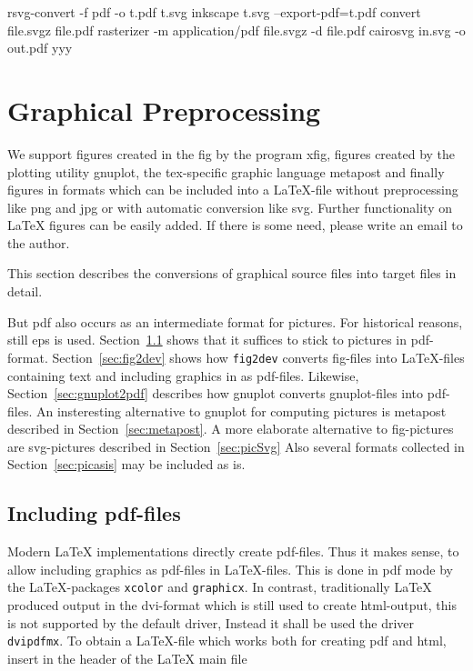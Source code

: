 \documentclass[12pt]{book}
\newcommand{\gls}[1]{#1}
\begin{document}
rsvg-convert -f pdf -o t.pdf t.svg
inkscape t.svg --export-pdf=t.pdf
convert file.svgz file.pdf 
rasterizer -m application/pdf file.svgz -d file.pdf
cairosvg in.svg -o out.pdf
yyy

\chapter{Graphical Preprocessing}\label{chap:GraphConversions}

We support figures created in the \gls{fig} by the program xfig, 
figures created by the plotting utility gnuplot, 
the tex-specific graphic language metapost 
and finally figures in formats which can be included into a \LaTeX-file 
without preprocessing like \gls{png} and \gls{jpg} 
or with automatic conversion like \gls{svg}. 
Further functionality on \LaTeX{} figures can be easily added. 
If there is some need, please write an email to the author. 



This section describes the conversions of 
graphical source files into target files 
in detail. 

But pdf also occurs as an intermediate format for pictures. 
For historical reasons, still \gls{eps} is used. 
Section~\ref{sec:figpdf} shows that it suffices to stick to pictures 
in pdf-format. 
Section~\ref{sec:fig2dev} shows how \texttt{fig2dev} converts fig-files 
into \LaTeX-files containing text and including graphics in as pdf-files. 
Likewise, Section~\ref{sec:gnuplot2pdf} describes 
how gnuplot converts gnuplot-files into pdf-files. 
An insteresting alternative to gnuplot for computing pictures 
is metapost described in Section~\ref{sec:metapost}. 
A more elaborate alternative to fig-pictures are svg-pictures 
described in Section~\ref{sec:picSvg}
Also several formats collected in Section~\ref{sec:picasis} 
may be included as is. 



\section{Including pdf-files}\label{sec:figpdf}

Modern \LaTeX{} implementations directly create pdf-files. 
Thus it makes sense, to allow including graphics as pdf-files 
in \LaTeX-files. 
This is done in pdf mode 
by the \LaTeX-packages \texttt{xcolor} and \texttt{graphicx}. 
In contrast, traditionally \LaTeX{} produced output in the \gls{dvi}-format 
which is still used to create \gls{html}-output, 
this is not supported by the default driver, 
Instead it shall be used the driver \texttt{dvipdfmx}. 
To obtain a \LaTeX-file which works both for creating pdf and html, 
insert in the header of the \LaTeX{} main file 
%
\lstset{language=tex, basicstyle=\small}

\end{document}
